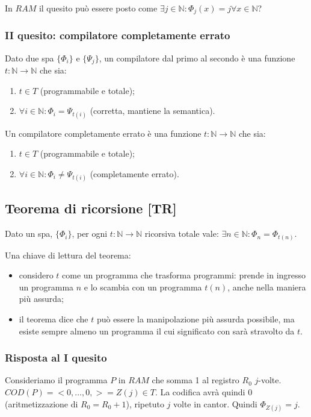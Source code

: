 \documentclass{article}
\begin{document}
In $RAM$ il quesito può essere posto come $\exists j \in \mathbb{N}:\Phi_j(x)=j \forall x \in \mathbb{N}$?



\subsubsection{II quesito: compilatore completamente errato}
Dato due spa $\{ \Phi_i \}$ e $\{ \Psi_j \}$, un compilatore dal primo al secondo è una funzione $t:\mathbb{N} \rightarrow \mathbb{N}$ che sia:
\begin{enumerate}
	\item $t \in T$ (programmabile e totale);
	\item $\forall i \in \mathbb{N}: \Phi_i = \Psi_{t(i)}$ (corretta, mantiene la semantica).
\end{enumerate}
Un compilatore completamente errato è una funzione $t:\mathbb{N} \rightarrow \mathbb{N}$ che sia:
\begin{enumerate}
	\item $t \in T$ (programmabile e totale);
	\item $\forall i \in \mathbb{N}: \Phi_i \neq \Psi_{t(i)}$ (completamente errato).
\end{enumerate}




\subsection{Teorema di ricorsione [TR]}
Dato un spa, $\{ \Phi_i \}$, per ogni $t:\mathbb{N} \rightarrow \mathbb{N}$ ricorsiva totale vale: $\exists n \in \mathbb{N}:\Phi_n=\Phi_{t(n)}$.




Una chiave di lettura del teorema:
\begin{itemize}
	\item considero $t$ come un programma che trasforma programmi: prende in ingresso un programma $n$ e lo scambia con un programma $t(n)$, anche nella maniera più assurda;
	\item il teorema dice che $t$ può essere la manipolazione più assurda possibile, ma esiste sempre almeno un programma il cui significato con sarà stravolto da $t$.
\end{itemize}

\subsubsection{Risposta al I quesito}
Consideriamo il programma $P$ in $RAM$ che somma 1 al registro $R_0$ $j$-volte. $COD(P)=<0,\dots,0,>=Z(j)\in T$. La codifica avrà quindi $0$ (aritmetizzazione di $R_0=R_0+1$), ripetuto $j$ volte in cantor. Quindi $\Phi_{Z(j)}=j$.
\end{document}
